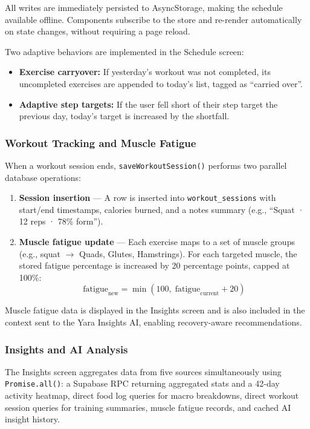 All writes are immediately persisted to AsyncStorage, making the schedule
available offline. Components subscribe to the store and re-render
automatically on state changes, without requiring a page reload.

Two adaptive behaviors are implemented in the Schedule screen:
\begin{itemize}
    \item \textbf{Exercise carryover:} If yesterday's workout was not
    completed, its uncompleted exercises are appended to today's list, tagged
    as ``carried over''.
    \item \textbf{Adaptive step targets:} If the user fell short of their
    step target the previous day, today's target is increased by the
    shortfall.
\end{itemize}

\subsubsection{Workout Tracking and Muscle Fatigue}

When a workout session ends, \texttt{saveWorkoutSession()} performs two
parallel database operations:

\begin{enumerate}
    \item \textbf{Session insertion} — A row is inserted into
    \texttt{workout\_sessions} with start/end timestamps, calories burned,
    and a notes summary (e.g., ``Squat · 12 reps · 78\% form'').

    \item \textbf{Muscle fatigue update} — Each exercise maps to a set of
    muscle groups (e.g., squat $\rightarrow$ Quads, Glutes, Hamstrings).
    For each targeted muscle, the stored fatigue percentage is increased by
    20 percentage points, capped at 100\%:
    \[
        \text{fatigue}_{\text{new}} = \min(100,\; \text{fatigue}_{\text{current}} + 20)
    \]
\end{enumerate}

Muscle fatigue data is displayed in the Insights screen and is also included
in the context sent to the Yara Insights AI, enabling recovery-aware
recommendations.

\subsubsection{Insights and AI Analysis}

The Insights screen aggregates data from five sources simultaneously using
\texttt{Promise.all()}: a Supabase RPC returning aggregated stats and a
42-day activity heatmap, direct food log queries for macro breakdowns, direct
workout session queries for training summaries, muscle fatigue records, and
cached AI insight history.

